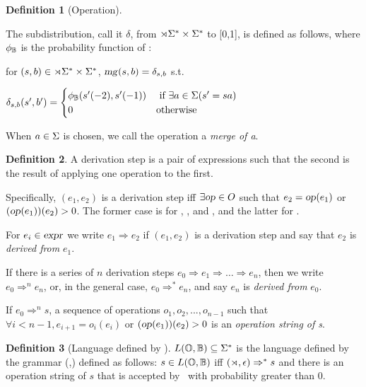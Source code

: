 \documentclass[12pt]{article}
\theoremstyle{definition}
\newtheorem{definition}{Definition}[section]
\begin{document}
\begin{definition}[Operation]
\begin{description}
     The subdistribution, call it $\delta$, from $\rtimes\Sigma^*\times\Sigma^*$ to [0,1], is defined as follows, where $\phi_{\mathbb{B}}$ is the probability function of \BIGR:

for $(s,b)\in\rtimes\Sigma^*\times\Sigma^*$, $\text{\textsl{mg}}(s,b) = \delta_{s,b}$ s.t.
     
$  \delta_{s,b}(s',b') =
\begin{cases}
  \phi_{\mathbb{B}}(s'(-2),s'(-1)) & \text{ if } \exists a\in\Sigma (s' = sa)\\
  0 & \text{otherwise}
\end{cases}
$

When $a\in\Sigma$ is chosen, we call the operation a \textit{merge of a}.


  \end{description}

\end{definition}






\begin{definition}
  A derivation step is a pair of expressions such that the second is the result of applying one operation to the first.

  Specifically,  $(e_1,e_2)$ is a derivation step iff $\exists \text{\textsl{op}}\in O$ such that $e_2=\text{\textsl{op}}(e_1)$ or $(\text{\textsl{op}}(e_1))(e_2)>0$. The former case is for \cp, \cl, and \ed, and the latter for \mg.

  For $e_i\in\text{\textsl{expr}}$  we write $e_1 \Rightarrow e_2$ if $(e_1,e_2)$ is a derivation step and say that $e_2$ is \textit{derived from} $e_1$.

  If there is a series of $n$ derivation steps $e_0\Rightarrow e_1 \Rightarrow \dots \Rightarrow e_n$, then we write $e_0\Rightarrow^n e_n$, or, in the general case, $e_0\Rightarrow^* e_n$, and say  $e_n$ is \textit{derived from} $e_0$.

  If $e_0\Rightarrow^n s$, a sequence of operations $o_1,o_2,...,o_{n-1}$ such that $\forall i<n-1, e_{i+1}=o_i(e_i)$ or $(\text{\textsl{op}}(e_1))(e_2)>0$ is an \textit{operation string of s}. 


\end{definition}

\begin{definition}[Language defined by \OURG]
$L(\mathbb{O},\mathbb{B})\subseteq\Sigma^*$ is the language defined by the grammar (\OPS,\BIGR) defined as follows:   $s\in L(\mathbb{O},\mathbb{B})$ iff $(\rtimes,\epsilon)\Rightarrow^*s$ and there is an operation string of $s$ that is accepted by \OPS~with probability greater than 0.
\end{definition}
\end{document}
